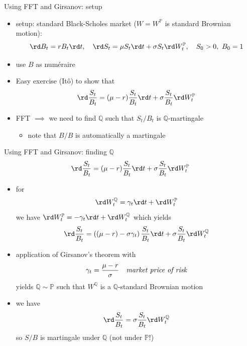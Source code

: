 \documentclass[pdf, handout]{beamer}
\begin{document}
\begin{frame}{Using FFT and Girsanov: setup}
\begin{itemize}
\item setup: standard Black-Scholes market ($W=W^{\mathbb{P}}$ is standard Brownian motion):
\[
\rd B_t = rB_t\rd t,\quad \rd S_t= \mu S_t\rd t +\sigma S_t \rd W_t^{\mathbb{P}},
\quad S_0>0,\,\,B_0=1
\]
\item use $B$ as num\'{e}raire
\item
Easy exercise (It\^o) to show that
\[
\rd \frac{S_t}{B_t} =(\mu -r) \frac{S_t}{B_t} \rd t + \sigma \frac{S_t}{B_t} \rd W_t^{\mathbb{P}}
\]
\item FFT $\implies$ we need to find $\mathbb{Q}$ such that $S_t/B_t$ is 
$\mathbb{Q}$-martingale
\begin{itemize}
\item note that $B/B$ is automatically a martingale
\end{itemize}
\end{itemize}
\end{frame}

\begin{frame}{Using FFT and Girsanov: finding $\mathbb{Q}$}
\[
\rd \frac{S_t}{B_t} =(\mu -r) \frac{S_t}{B_t} \rd t + \sigma \frac{S_t}{B_t} \rd W_t^{\mathbb{P}}
\]
\begin{itemize}
\item for
\[
\rd W^{\mathbb{Q}}_t=\gamma_t \rd t + \rd W^{\mathbb{P}}_t
\]
we have $\rd W^{\mathbb{P}}_t = -\gamma_t \rd t + \rd W^{\mathbb{Q}}_t$ which yields
\[
\rd \frac{S_t}{B_t} =\left((\mu -r)-\sigma \gamma_t \right) \frac{S_t}{B_t} \rd t + \sigma \frac{S_t}{B_t} \rd W_t^{\mathbb{Q}}
\]
\item application of Girsanov's theorem with
\[
\gamma_t=\frac{\mu-r}{\sigma}\quad \text{\emph{market price of risk}}
\]
yields $\mathbb{Q}\sim\mathbb{P}$ such that
$W^{\mathbb{Q}}$ is a $\mathbb{Q}$-standard Brownian motion
\item  we have
\[
\rd \frac{S_t}{B_t} = \sigma \frac{S_t}{B_t} \rd W_t^{\mathbb{Q}}
\]
so $S/B$ is martingale under $\mathbb{Q}$ (not under $\mathbb{P}$!)
\end{itemize}
\end{frame}
\end{document}
